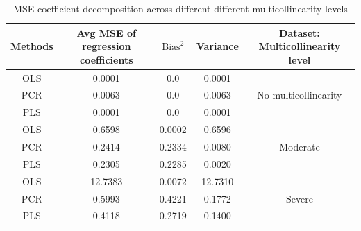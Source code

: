 \documentclass[11pt,twoside,a4paper]{article}
\begin{document}
\begin{table}[h]
    \centering
    \begin{tabular}{|c|c|c|c|c|}
        \hline
        Methods & Avg MSE of regression coefficients &  $\text{Bias}^2$ & Variance & Dataset: Multicollinearity level \\
        \hline
        OLS & 0.0001 & 0.0 & 0.0001 & \multirow{3}{*}{No multicollinearity} \\
        PCR & 0.0063 & 0.0 & 0.0063 &  \\
        PLS & 0.0001 & 0.0 & 0.0001 &  \\
        \hline
        OLS & 0.6598 & 0.0002 & 0.6596 & \multirow{3}{*}{Moderate} \\        
        PCR & 0.2414 & 0.2334 & 0.0080 &  \\
        PLS & 0.2305 & 0.2285 & 0.0020 &  \\
        \hline
        OLS & 12.7383 & 0.0072 & 12.7310 & \multirow{3}{*}{Severe} \\
        PCR & 0.5993 & 0.4221 & 0.1772 &  \\
        PLS & 0.4118 & 0.2719 & 0.1400 &  \\ 
        \hline
    \end{tabular}
    \caption{MSE coefficient decomposition across different different multicollinearity levels}
    \label{tab:Stability_analysis}
\end{table}
\newpage

\renewcommand\refname {\section {Bibliography}}
\end{document}
